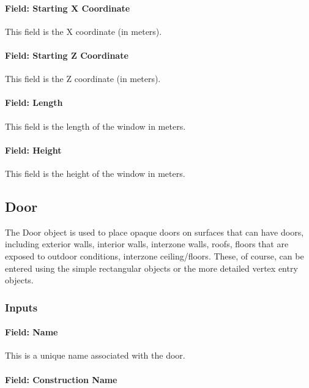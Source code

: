 \paragraph{Field: Starting X Coordinate}\label{field-starting-x-coordinate-10}

This field is the X coordinate (in meters).

\paragraph{Field: Starting Z Coordinate}\label{field-starting-z-coordinate-10}

This field is the Z coordinate (in meters).

\paragraph{Field: Length}\label{field-length-10}

This field is the length of the window in meters.

\paragraph{Field: Height}\label{field-height-4}

This field is the height of the window in meters.

\subsection{Door}\label{door}

The Door object is used to place opaque doors on surfaces that can have doors, including exterior walls, interior walls, interzone walls, roofs, floors that are exposed to outdoor conditions, interzone ceiling/floors. These, of course, can be entered using the simple rectangular objects or the more detailed vertex entry objects.

\subsubsection{Inputs}\label{inputs-15-016}

\paragraph{Field: Name}\label{field-name-11-015}

This is a unique name associated with the door.

\paragraph{Field: Construction Name}\label{field-construction-name-11}

